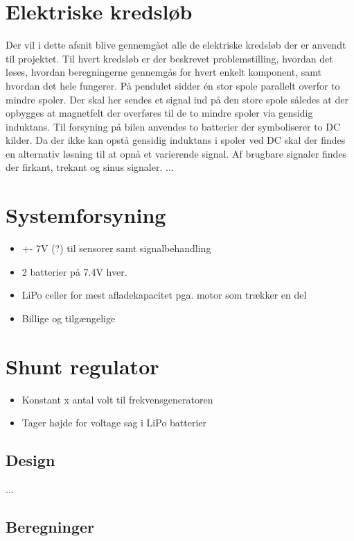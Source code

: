 \section{Elektriske kredsløb}\label{sec:sec_sparningsreg}
Der vil i dette afsnit blive gennemgået alle de elektriske kredsløb der er anvendt til projektet. 
Til hvert kredsløb er der beskrevet problemstilling, hvordan det løses, hvordan beregningerne gennemgås for hvert enkelt komponent, samt hvordan det hele fungerer.
På pendulet sidder én stor spole parallelt overfor to mindre spoler. 
Der skal her sendes et signal ind på den store spole således at der opbygges at magnetfelt der overføres til de to mindre spoler via gensidig induktans. 
Til forsyning på bilen anvendes to batterier der symboliserer to DC kilder. 
Da der ikke kan opstå gensidig induktans i spoler ved DC skal der findes en alternativ løsning til at opnå et varierende signal. 
Af brugbare signaler findes der firkant, trekant og sinus signaler.
...
\section{Systemforsyning}
\begin{itemize}
	\item +- 7V (?) til sensorer samt signalbehandling
	\item 2 batterier på 7.4V hver. 
	\item LiPo celler for mest afladekapacitet pga. motor som trækker en del
	\item Billige og tilgængelige
\end{itemize}
\section{Shunt regulator}



\begin{itemize}
	\item Konstant x antal volt til frekvensgeneratoren
	\item Tager højde for voltage sag i LiPo batterier
\end{itemize}

	
	\subsection{Design}
	...
	
	\subsection{Beregninger}
	
